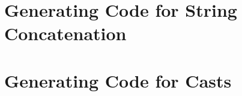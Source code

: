 \documentclass[8pt,a4paper,compress]{beamer}
\begin{document}
\begin{frame}[fragile]
\pause


\end{frame}

\section{Generating Code for String Concatenation}
\begin{frame}[fragile]
\pause


\end{frame}

\section{Generating Code for Casts}
\begin{frame}[fragile]
\pause


\end{frame}
\end{document}
